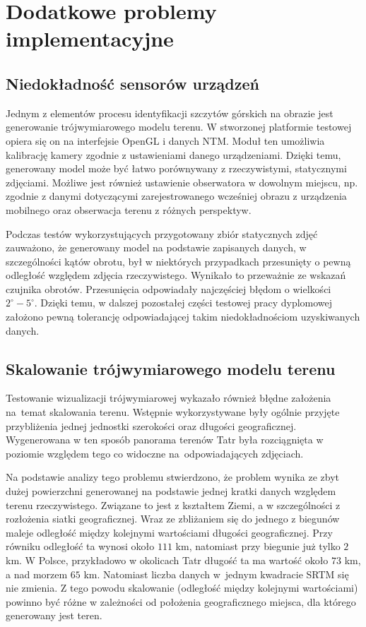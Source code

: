 \newpage

\section{Dodatkowe problemy implementacyjne}


\subsection{Niedokładność sensorów urządzeń}

Jednym z elementów procesu identyfikacji szczytów górskich na obrazie jest generowanie trójwymiarowego modelu terenu. W stworzonej platformie testowej opiera się on na interfejsie OpenGL i danych NTM. Moduł ten umożliwia kalibrację kamery zgodnie z ustawieniami danego urządzeniami.  Dzięki temu, generowany model może być łatwo porównywany z rzeczywistymi, statycznymi zdjęciami. Możliwe jest również ustawienie obserwatora w dowolnym miejscu, np. zgodnie z danymi dotyczącymi zarejestrowanego wcześniej obrazu z urządzenia mobilnego oraz obserwacja terenu z różnych perspektyw. 

Podczas testów wykorzystujących przygotowany zbiór statycznych zdjęć zauważono, że generowany model na podstawie zapisanych danych, w szczególności kątów obrotu, był w niektórych przypadkach przesunięty o pewną odległość względem zdjęcia rzeczywistego. Wynikało to przeważnie ze wskazań czujnika obrotów. Przesunięcia odpowiadały najczęściej błędom o wielkości $2^\circ-5^\circ$. Dzięki temu, w dalszej pozostałej części testowej pracy dyplomowej założono pewną tolerancję odpowiadającej takim niedokładnościom uzyskiwanych danych.

\subsection{Skalowanie trójwymiarowego modelu terenu}

Testowanie wizualizacji trójwymiarowej wykazało również błędne założenia na~temat skalowania terenu. Wstępnie wykorzystywane były ogólnie przyjęte przybliżenia jednej jednostki szerokości oraz długości geograficznej. Wygenerowana w ten sposób panorama terenów Tatr była rozciągnięta w poziomie względem tego co widoczne na~odpowiadających zdjęciach.

Na podstawie analizy tego problemu stwierdzono, że problem wynika ze zbyt dużej powierzchni generowanej na podstawie jednej kratki danych względem terenu rzeczywistego. Związane to jest z kształtem Ziemi, a w szczególności z rozłożenia siatki geograficznej. Wraz ze zbliżaniem się do jednego z biegunów maleje odległość między kolejnymi wartościami długości geograficznej. Przy równiku odległość ta wynosi około $111$ km, natomiast przy biegunie już tylko $2$ km. W Polsce, przykładowo w okolicach Tatr długość ta ma wartość około $73$ km, a nad morzem $65$ km. Natomiast liczba danych w~jednym kwadracie SRTM się nie zmienia. Z tego powodu skalowanie (odległość między kolejnymi wartościami) powinno być różne w zależności od położenia geograficznego miejsca, dla którego generowany jest teren. 

